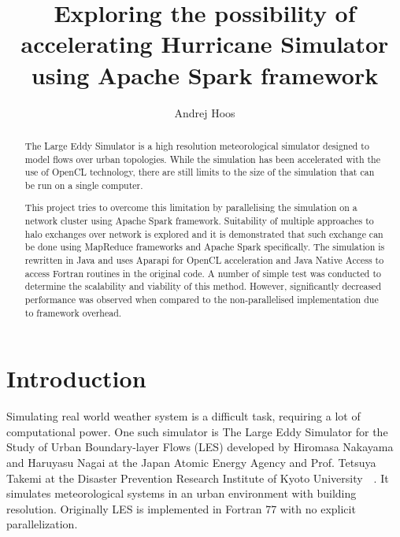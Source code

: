 \documentclass{l4proj}
\begin{document}
\title{Exploring the possibility of accelerating Hurricane Simulator \\ using Apache Spark framework}
\author{Andrej Hoos}
\maketitle

\begin{abstract}
The Large Eddy Simulator is a high resolution meteorological simulator designed to model
flows over urban topologies. While the simulation has been accelerated with the use of 
OpenCL technology, there are still limits to the size of the simulation that can be run on a single computer.

This project tries to overcome this limitation by parallelising the simulation on a 
network cluster using Apache Spark framework. Suitability of multiple approaches to 
halo exchanges over network is explored and it is demonstrated that such exchange 
can be done using MapReduce frameworks and Apache Spark specifically. The simulation 
is rewritten in Java and uses Aparapi for OpenCL acceleration and Java Native Access 
to access Fortran routines in the original code. A number of simple test was conducted 
to determine the scalability and viability of this method. However, significantly 
decreased performance was observed when compared to the non-parallelised implementation 
due to framework overhead.
\end{abstract}

\educationalconsent
%
%
\tableofcontents

\chapter{Introduction}

Simulating real world weather system is a difficult task, requiring a lot of computational power.
One such simulator is The Large Eddy Simulator for the Study of Urban Boundary-layer Flows (LES)
developed by  Hiromasa Nakayama and Haruyasu Nagai at the Japan Atomic Energy Agency
and Prof. Tetsuya Takemi at the Disaster Prevention Research Institute of Kyoto University~\cite{les_analysis}~\cite{les}.
It simulates meteorological systems in an urban environment with building resolution.
Originally LES is implemented in Fortran 77 with no explicit parallelization.
\end{document}

